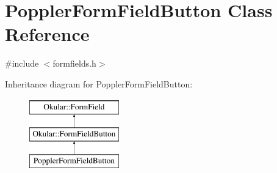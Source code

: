 \hypertarget{classPopplerFormFieldButton}{\section{Poppler\+Form\+Field\+Button Class Reference}
\label{classPopplerFormFieldButton}
}


{\ttfamily \#include $<$formfields.\+h$>$}

Inheritance diagram for Poppler\+Form\+Field\+Button\+:\begin{figure}[H]
\begin{center}
\leavevmode
\includegraphics[height=3.000000cm]{classPopplerFormFieldButton}
\end{center}
\end{figure}
